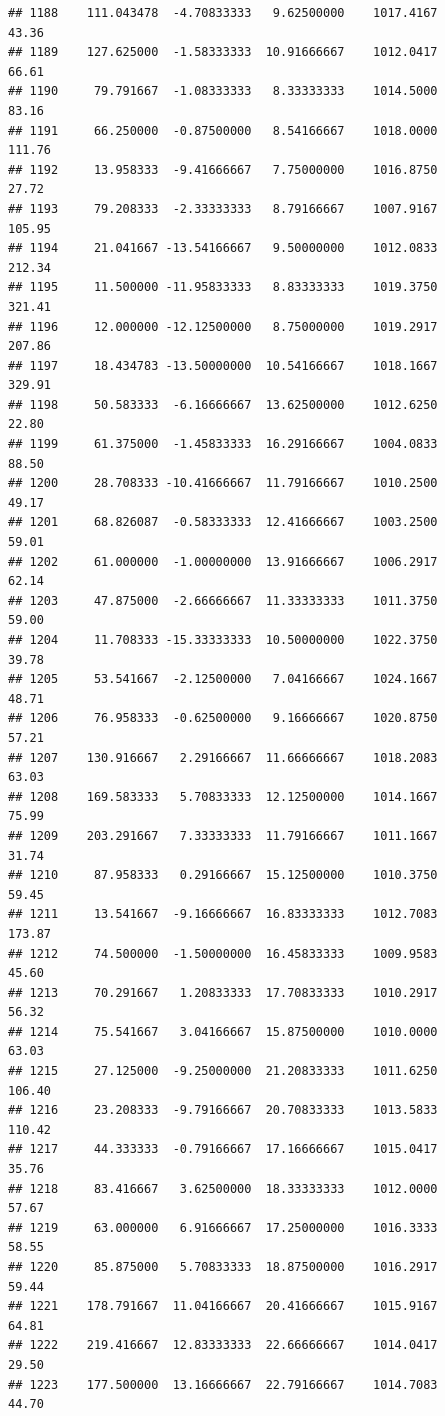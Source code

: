\documentclass[
]{article}
\begin{document}
\begin{verbatim}
## 1188    111.043478  -4.70833333   9.62500000    1017.4167       43.36
## 1189    127.625000  -1.58333333  10.91666667    1012.0417       66.61
## 1190     79.791667  -1.08333333   8.33333333    1014.5000       83.16
## 1191     66.250000  -0.87500000   8.54166667    1018.0000      111.76
## 1192     13.958333  -9.41666667   7.75000000    1016.8750       27.72
## 1193     79.208333  -2.33333333   8.79166667    1007.9167      105.95
## 1194     21.041667 -13.54166667   9.50000000    1012.0833      212.34
## 1195     11.500000 -11.95833333   8.83333333    1019.3750      321.41
## 1196     12.000000 -12.12500000   8.75000000    1019.2917      207.86
## 1197     18.434783 -13.50000000  10.54166667    1018.1667      329.91
## 1198     50.583333  -6.16666667  13.62500000    1012.6250       22.80
## 1199     61.375000  -1.45833333  16.29166667    1004.0833       88.50
## 1200     28.708333 -10.41666667  11.79166667    1010.2500       49.17
## 1201     68.826087  -0.58333333  12.41666667    1003.2500       59.01
## 1202     61.000000  -1.00000000  13.91666667    1006.2917       62.14
## 1203     47.875000  -2.66666667  11.33333333    1011.3750       59.00
## 1204     11.708333 -15.33333333  10.50000000    1022.3750       39.78
## 1205     53.541667  -2.12500000   7.04166667    1024.1667       48.71
## 1206     76.958333  -0.62500000   9.16666667    1020.8750       57.21
## 1207    130.916667   2.29166667  11.66666667    1018.2083       63.03
## 1208    169.583333   5.70833333  12.12500000    1014.1667       75.99
## 1209    203.291667   7.33333333  11.79166667    1011.1667       31.74
## 1210     87.958333   0.29166667  15.12500000    1010.3750       59.45
## 1211     13.541667  -9.16666667  16.83333333    1012.7083      173.87
## 1212     74.500000  -1.50000000  16.45833333    1009.9583       45.60
## 1213     70.291667   1.20833333  17.70833333    1010.2917       56.32
## 1214     75.541667   3.04166667  15.87500000    1010.0000       63.03
## 1215     27.125000  -9.25000000  21.20833333    1011.6250      106.40
## 1216     23.208333  -9.79166667  20.70833333    1013.5833      110.42
## 1217     44.333333  -0.79166667  17.16666667    1015.0417       35.76
## 1218     83.416667   3.62500000  18.33333333    1012.0000       57.67
## 1219     63.000000   6.91666667  17.25000000    1016.3333       58.55
## 1220     85.875000   5.70833333  18.87500000    1016.2917       59.44
## 1221    178.791667  11.04166667  20.41666667    1015.9167       64.81
## 1222    219.416667  12.83333333  22.66666667    1014.0417       29.50
## 1223    177.500000  13.16666667  22.79166667    1014.7083       44.70

\end{verbatim}
\end{document}
